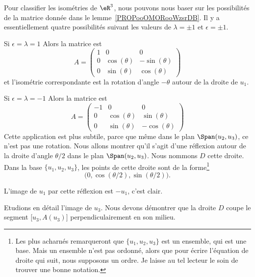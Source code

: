 Pour classifier les isométries de \( \eR^3\), nous pouvons nous baser sur les possibilités de la matrice donnée dans le lemme~\ref{PROPooOMORooWzsrDB}. Il y a essentiellement quatre possibilités suivant les valeurs de \( \lambda=\pm 1\) et \( \epsilon=\pm 1\).

\begin{subproof}
	\item[Si \( \epsilon=\lambda=1\)] Alors la matrice est
	\begin{equation}
		A=\begin{pmatrix}
			1 & 0            & 0             \\
			0 & \cos(\theta) & -\sin(\theta) \\
			0 & \sin(\theta) & \cos(\theta)
		\end{pmatrix}
	\end{equation}
	et l'isométrie correspondante est la rotation d'angle \( -\theta\) autour de la droite de \( u_1\).

	\item[Si \( \epsilon=\lambda=-1\)]
	Alors la matrice est
	\begin{equation}
		A=\begin{pmatrix}
			-1 & 0            & 0             \\
			0  & \cos(\theta) & \sin(\theta)  \\
			0  & \sin(\theta) & -\cos(\theta)
		\end{pmatrix}
	\end{equation}
	Cette application est plus subtile, parce que même dans le plan \( \Span(u_2,u_3)\), ce n'est pas une rotation. Nous allons montrer qu'il s'agit d'une réflexion autour de la droite d'angle \( \theta/2\) dans le plan \( \Span(u_2,u_3)\). Nous nommons \( D\) cette droite. Dans la base \( \{ u_1,u_2,u_3 \}\), les points de cette droite sont de la forme\footnote{Les plus acharnés remarqueront que \( \{ u_1,u_2,u_3 \}\) est un ensemble, qui est une base. Mais un ensemble n'est pas ordonné, alors que pour écrire l'équation de droite qui suit, nous supposons un ordre. Je laisse au tel lecteur le soin de trouver une bonne notation.}
	\begin{equation}
		\big( 0,\cos(\theta/2),\sin(\theta/2) \big).
	\end{equation}

	L'image de \( u_1\) par cette réflexion est \(-u_1\), c'est clair.

	Etudions en détail l'image de \( u_3\). Nous devons démontrer que la droite \( D\) coupe le segment \( \mathopen[ u_3 , A(u_3) \mathclose]\) perpendiculairement en son milieu.


\end{subproof}
